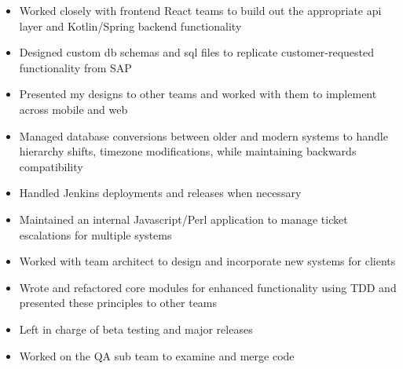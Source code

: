 \documentclass[10pt,a4paper,ragged2e]{altacv}
\begin{document}
\divider

\begin{itemize}
\item Worked closely with frontend React teams to build out the appropriate api layer and Kotlin/Spring backend functionality
\item Designed custom db schemas and sql files to replicate customer-requested functionality from SAP
\item Presented my designs to other teams and worked with them to implement across mobile
and web
\item Managed database conversions between older and modern systems to handle hierarchy shifts,
timezone modifications, while maintaining backwards compatibility 
\item Handled Jenkins deployments and releases when necessary
\end{itemize}

\divider

\begin{itemize}
\item Maintained an internal Javascript/Perl application to manage ticket escalations for multiple systems
\item Worked with team architect to design and incorporate new systems for clients
\item Wrote and refactored core modules for enhanced functionality using TDD and presented these principles to other teams
\item Left in charge of beta testing and major releases
\item Worked on the QA sub team to examine and merge code
\end{itemize}

\divider
\end{document}

